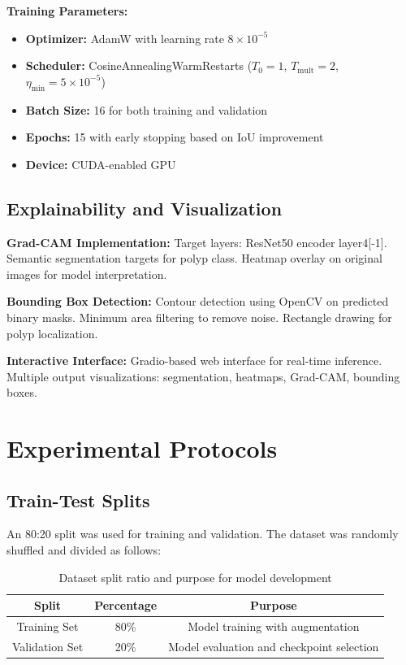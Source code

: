 \documentclass[a4paper,12pt]{report}
\begin{document}
\textbf{Training Parameters:}
\begin{itemize}
    \item \textbf{Optimizer:} AdamW with learning rate \(8 \times 10^{-5}\)
    \item \textbf{Scheduler:} CosineAnnealingWarmRestarts (\(T_0=1\), \(T_\text{mult}=2\), \(\eta_\text{min}=5 \times 10^{-5}\))
    \item \textbf{Batch Size:} 16 for both training and validation
    \item \textbf{Epochs:} 15 with early stopping based on IoU improvement
    \item \textbf{Device:} CUDA-enabled GPU
\end{itemize}

\vspace{1.5em}

\subsection{Explainability and Visualization}

\textbf{Grad-CAM Implementation:} Target layers: ResNet50 encoder layer4[-1]. Semantic segmentation targets for polyp class. Heatmap overlay on original images for model interpretation.

\vspace{1em}

\textbf{Bounding Box Detection:} Contour detection using OpenCV on predicted binary masks. Minimum area filtering to remove noise. Rectangle drawing for polyp localization.

\vspace{1em}

\textbf{Interactive Interface:} Gradio-based web interface for real-time inference. Multiple output visualizations: segmentation, heatmaps, Grad-CAM, bounding boxes.


\section{Experimental Protocols}

\subsection{Train-Test Splits}

An 80:20 split was used for training and validation. The dataset was randomly shuffled and divided as follows:

\begin{table}[h!]
\centering
\begin{tabular}{|c|c|c|}
\hline
\textbf{Split} & \textbf{Percentage} & \textbf{Purpose} \\ \hline
Training Set & 80\% & Model training with augmentation \\ \hline
Validation Set & 20\% & Model evaluation and checkpoint selection \\ \hline
\end{tabular}
\caption{Dataset split ratio and purpose for model development}
\label{table:train_val_split}
\end{table}
\end{document}
